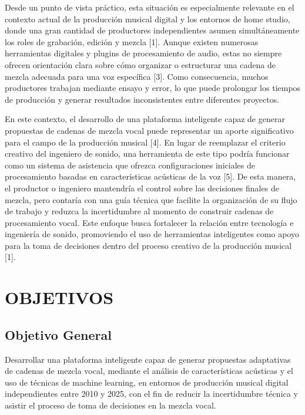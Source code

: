 \documentclass[12pt]{article}
\begin{document}
Desde un punto de vista práctico, esta situación es especialmente relevante en el contexto actual de la producción musical digital y los entornos de home studio, donde una gran cantidad de productores independientes asumen simultáneamente los roles de grabación, edición y mezcla [1]. Aunque existen numerosas herramientas digitales y plugins de procesamiento de audio, estas no siempre ofrecen orientación clara sobre cómo organizar o estructurar una cadena de mezcla adecuada para una voz específica [3]. Como consecuencia, muchos productores trabajan mediante ensayo y error, lo que puede prolongar los tiempos de producción y generar resultados inconsistentes entre diferentes proyectos.

En este contexto, el desarrollo de una plataforma inteligente capaz de generar propuestas de cadenas de mezcla vocal puede representar un aporte significativo para el campo de la producción musical [4]. En lugar de reemplazar el criterio creativo del ingeniero de sonido, una herramienta de este tipo podría funcionar como un sistema de asistencia que ofrezca configuraciones iniciales de procesamiento basadas en características acústicas de la voz [5]. De esta manera, el productor o ingeniero mantendría el control sobre las decisiones finales de mezcla, pero contaría con una guía técnica que facilite la organización de su flujo de trabajo y reduzca la incertidumbre al momento de construir cadenas de procesamiento vocal. Este enfoque busca fortalecer la relación entre tecnología e ingeniería de sonido, promoviendo el uso de herramientas inteligentes como apoyo para la toma de decisiones dentro del proceso creativo de la producción musical [1].

\clearpage
\section{OBJETIVOS}

\subsection*{Objetivo General}

Desarrollar una plataforma inteligente capaz de generar propuestas adaptativas de cadenas de mezcla vocal, mediante el análisis de características acústicas y el uso de técnicas de machine learning, en entornos de producción musical digital independientes entre 2010 y 2025, con el fin de reducir la incertidumbre técnica y asistir el proceso de toma de decisiones en la mezcla vocal.
\end{document}
